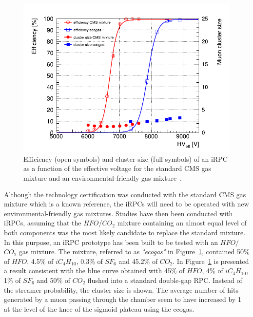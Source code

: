 \begingroup\setlength{\intextsep}{5pt}\setlength{\columnsep}{15pt}

	\begin{figure}
		\centering
		\includegraphics[width=\linewidth]{fig/chapt3/iRPC-HFO-mixture.pdf}
		\caption{\label{fig:iRPC-eco} Efficiency (open symbols) and cluster size (full symbols) of an iRPC as a function of the effective voltage for the standard CMS gas mixture and an environmental-friendly gas mixture~\cite{PHASEIITP}.}
	\end{figure}
	
	Although the technology certification was conducted with the standard CMS gas mixture which is a known reference, the iRPCs will need to be operated with new environmental-friendly gas mixtures. Studies have then been conducted with iRPCs, assuming that the $HFO$/$CO_2$ mixture containing an almost equal level of both components was the most likely candidate to replace the standard mixture. In this purpose, an iRPC prototype has been built to be tested with an $HFO$/$CO_2$ gas mixture. The mixture, referred to as \textit{"ecogas"} in Figure~\ref{fig:iRPC-eco}, contained 50\% of $HFO$, 4.5\% of $iC_4H_{10}$, 0.3\% of $SF_6$ and 45.2\% of $CO_2$. In Figure~\ref{fig:iRPC-eco} is presented a result consistent with the blue curve obtained with 45\% of $HFO$, 4\% of $iC_4H_{10}$, 1\% of $SF_6$ and 50\% of $CO_2$ flushed into a standard double-gap RPC. Instead of the streamer probability, the cluster size is shown. The average number of hits generated by a muon passing through the chamber seem to have increased by 1 at the level of the knee of the sigmoid plateau using the ecogas.
	
\endgroup

\clearpage{\pagestyle{empty}\cleardoublepage}